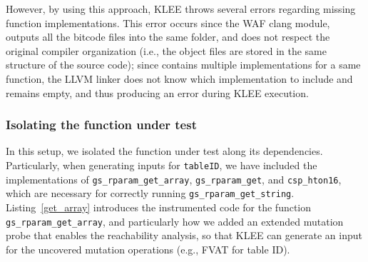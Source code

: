 However, by using this approach, KLEE throws several errors regarding missing function implementations. This error occurs since the WAF clang module, outputs all the bitcode files into the same folder, and does not respect the original compiler organization (i.e., the object files are stored in the same structure of the source code); since \PARAM contains multiple implementations for a same function, the LLVM linker does not know which implementation to include and remains empty, and thus producing an error during KLEE execution.


\subsubsection{Isolating the function under test}

In this setup, we isolated the function under test along its dependencies. Particularly, when generating inputs for \texttt{tableID}, we have included the implementations of \texttt{gs\_rparam\_get\_array}, \texttt{gs\_rparam\_get}, and \texttt{csp\_hton16}, which are necessary for correctly running \texttt{gs\_rparam\_get\_string}.
Listing~\ref{get_array} introduces the instrumented code for the function \texttt{gs\_rparam\_get\_array}, and particularly how we added an extended mutation probe that enables the reachability analysis, so that KLEE can generate an input for the uncovered mutation operations (e.g., FVAT for table ID).

